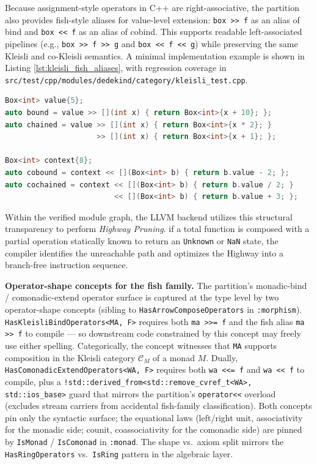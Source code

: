 \documentclass[11pt, a4paper]{report}
\begin{document}
Because assignment-style operators in C++ are right-associative, the partition also provides fish-style aliases for value-level extension: \texttt{box >> f} as an alias of bind and \texttt{box << f} as an alias of cobind. This supports readable left-associated pipelines (e.g., \texttt{box >> f >> g} and \texttt{box << f << g}) while preserving the same Kleisli and co-Kleisli semantics.
A minimal implementation example is shown in Listing \ref{lst:kleisli_fish_aliases}, with regression coverage in \texttt{src/test/cpp/modules/dedekind/category/kleisli\_test.cpp}.

\begin{lstlisting}[language=C++, caption={Value-level fish aliases for Kleisli and co-Kleisli extension.}, label={lst:kleisli_fish_aliases}]
Box<int> value{5};
auto bound = value >> [](int x) { return Box<int>{x + 10}; };
auto chained = value >> [](int x) { return Box<int>{x * 2}; }
                     >> [](int x) { return Box<int>{x + 1}; };

Box<int> context{8};
auto cobound = context << [](Box<int> b) { return b.value - 2; };
auto cochained = context << [](Box<int> b) { return b.value / 2; }
                         << [](Box<int> b) { return b.value + 3; };
\end{lstlisting}

Within the verified module graph, the LLVM backend utilizes this structural transparency to perform \textit{Highway Pruning}. if a total function is composed with a partial operation statically known to return an \texttt{Unknown} or \texttt{NaN} state, the compiler identifies the unreachable path and optimizes the Highway into a branch-free instruction sequence.

\textbf{Operator-shape concepts for the fish family.} The partition's monadic-bind / comonadic-extend operator surface is captured at the type level by two operator-shape concepts (sibling to \texttt{HasArrowComposeOperators} in \texttt{:morphism}). \texttt{HasKleisliBindOperators<MA, F>} requires both \texttt{ma >>= f} and the fish alias \texttt{ma >> f} to compile --- so downstream code constrained by this concept may freely use either spelling. Categorically, the concept witnesses that \texttt{MA} supports composition in the Kleisli category $\mathcal{C}_M$ of a monad $M$. Dually, \texttt{HasComonadicExtendOperators<WA, F>} requires both \texttt{wa <<= f} and \texttt{wa << f} to compile, plus a \texttt{!std::derived\_from<std::remove\_cvref\_t<WA>, std::ios\_base>} guard that mirrors the partition's \texttt{operator<<} overload (excludes stream carriers from accidental fish-family classification). Both concepts pin only the syntactic surface; the equational laws (left/right unit, associativity for the monadic side; counit, coassociativity for the comonadic side) are pinned by \texttt{IsMonad} / \texttt{IsComonad} in \texttt{:monad}. The shape vs.\ axiom split mirrors the \texttt{HasRingOperators} vs.\ \texttt{IsRing} pattern in the algebraic layer.
\end{document}

